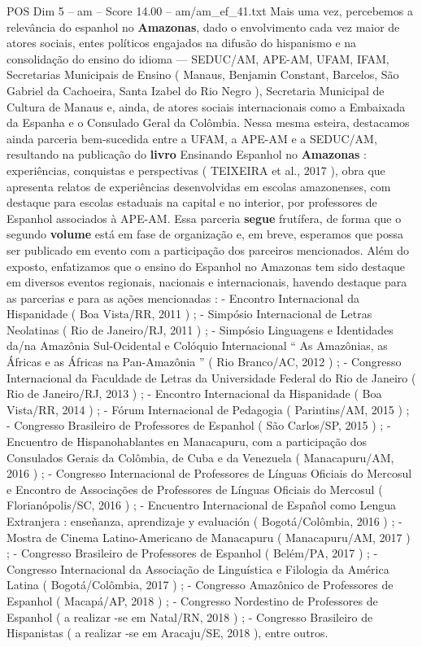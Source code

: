 \begin{textsample}{POS Dim 5 – am – Score 14.00 – am/am\_ef\_41.txt}
Mais uma vez, percebemos a relevância do espanhol no \textbf{Amazonas}, dado o envolvimento cada vez maior de atores sociais, entes políticos engajados na difusão do hispanismo e na consolidação do ensino do idioma — SEDUC/AM, APE-AM, UFAM, IFAM, Secretarias Municipais de Ensino ( Manaus, Benjamin Constant, Barcelos, São Gabriel da Cachoeira, Santa Izabel do Rio Negro ), Secretaria Municipal de Cultura de Manaus e, ainda, de atores sociais internacionais como a Embaixada da Espanha e o Consulado Geral da Colômbia.
Nessa mesma esteira, destacamos ainda parceria bem-sucedida entre a UFAM, a APE-AM e a SEDUC/AM, resultando na publicação do \textbf{livro} Ensinando Espanhol no \textbf{Amazonas} : experiências, conquistas e perspectivas ( TEIXEIRA et al., 2017 ), obra que apresenta relatos de experiências desenvolvidas em escolas amazonenses, com destaque para escolas estaduais na capital e no interior, por professores de Espanhol associados à APE-AM.
Essa parceria \textbf{segue} frutífera, de forma que o segundo \textbf{volume} está em fase de organização e, em breve, esperamos que possa ser publicado em evento com a participação dos parceiros mencionados.
Além do exposto, enfatizamos que o ensino do Espanhol no Amazonas tem sido destaque em diversos eventos regionais, nacionais e internacionais, havendo destaque para as parcerias e para as ações mencionadas : - Encontro Internacional da Hispanidade ( Boa Vista/RR, 2011 ) ; - Simpósio Internacional de Letras Neolatinas ( Rio de Janeiro/RJ, 2011 ) ; - Simpósio Linguagens e Identidades da/na Amazônia Sul-Ocidental e Colóquio Internacional “ As Amazônias, as Áfricas e as Áfricas na Pan-Amazônia ” ( Rio Branco/AC, 2012 ) ; - Congresso Internacional da Faculdade de Letras da Universidade Federal do Rio de Janeiro ( Rio de Janeiro/RJ, 2013 ) ; - Encontro Internacional da Hispanidade ( Boa Vista/RR, 2014 ) ; - Fórum Internacional de Pedagogia ( Parintins/AM, 2015 ) ; - Congresso Brasileiro de Professores de Espanhol ( São Carlos/SP, 2015 ) ; - Encuentro de Hispanohablantes en Manacapuru, com a participação dos Consulados Gerais da Colômbia, de Cuba e da Venezuela ( Manacapuru/AM, 2016 ) ; - Congresso Internacional de Professores de Línguas Oficiais do Mercosul e Encontro de Associações de Professores de Línguas Oficiais do Mercosul ( Florianópolis/SC, 2016 ) ; - Encuentro Internacional de Español como Lengua Extranjera : enseñanza, aprendizaje y evaluación ( Bogotá/Colômbia, 2016 ) ; - Mostra de Cinema Latino-Americano de Manacapuru ( Manacapuru/AM, 2017 ) ; - Congresso Brasileiro de Professores de Espanhol ( Belém/PA, 2017 ) ; - Congresso Internacional da Associação de Linguística e Filologia da América Latina ( Bogotá/Colômbia, 2017 ) ; - Congresso Amazônico de Professores de Espanhol ( Macapá/AP, 2018 ) ; - Congresso Nordestino de Professores de Espanhol ( a realizar -se em Natal/RN, 2018 ) ; - Congresso Brasileiro de Hispanistas ( a realizar -se em Aracaju/SE, 2018 ), entre outros.

\end{textsample}
